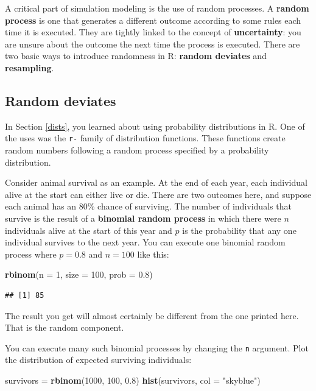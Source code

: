 \documentclass[]{book}
\newenvironment{Shaded}{\begin{snugshade}}{\end{snugshade}}
\newcommand{\KeywordTok}[1]{\textcolor[rgb]{0.13,0.29,0.53}{\textbf{#1}}}
\newcommand{\DataTypeTok}[1]{\textcolor[rgb]{0.13,0.29,0.53}{#1}}
\newcommand{\DecValTok}[1]{\textcolor[rgb]{0.00,0.00,0.81}{#1}}
\newcommand{\FloatTok}[1]{\textcolor[rgb]{0.00,0.00,0.81}{#1}}
\newcommand{\StringTok}[1]{\textcolor[rgb]{0.31,0.60,0.02}{#1}}
\newcommand{\NormalTok}[1]{#1}
\theoremstyle{definition}
\theoremstyle{definition}
\theoremstyle{definition}
\theoremstyle{remark}
\begin{document}
A critical part of simulation modeling is the use of random processes. A
\textbf{random process} is one that generates a different outcome
according to some rules each time it is executed. They are tightly
linked to the concept of \textbf{uncertainty}: you are unsure about the
outcome the next time the process is executed. There are two basic ways
to introduce randomness in R: \textbf{random deviates} and
\textbf{resampling}.

\subsection{Random deviates}\label{random-deviates}

In Section \ref{dists}, you learned about using probability
distributions in R. One of the uses was the \texttt{r-} family of
distribution functions. These functions create random numbers following
a random process specified by a probability distribution.

Consider animal survival as an example. At the end of each year, each
individual alive at the start can either live or die. There are two
outcomes here, and suppose each animal has an 80\% chance of surviving.
The number of individuals that survive is the result of a
\textbf{binomial random process} in which there were \(n\) individuals
alive at the start of this year and \(p\) is the probability that any
one individual survives to the next year. You can execute one binomial
random process where \(p = 0.8\) and \(n = 100\) like this:

\begin{Shaded}
\begin{Highlighting}[]
\KeywordTok{rbinom}\NormalTok{(}\DataTypeTok{n =} \DecValTok{1}\NormalTok{, }\DataTypeTok{size =} \DecValTok{100}\NormalTok{, }\DataTypeTok{prob =} \FloatTok{0.8}\NormalTok{)}
\end{Highlighting}
\end{Shaded}

\begin{verbatim}
## [1] 85
\end{verbatim}

The result you get will almost certainly be different from the one
printed here. That is the random component.

You can execute many such binomial processes by changing the \texttt{n}
argument. Plot the distribution of expected surviving individuals:

\begin{Shaded}
\begin{Highlighting}[]
\NormalTok{survivors =}\StringTok{ }\KeywordTok{rbinom}\NormalTok{(}\DecValTok{1000}\NormalTok{, }\DecValTok{100}\NormalTok{, }\FloatTok{0.8}\NormalTok{)}
\KeywordTok{hist}\NormalTok{(survivors, }\DataTypeTok{col =} \StringTok{"skyblue"}\NormalTok{)}
\end{Highlighting}
\end{Shaded}
\end{document}
